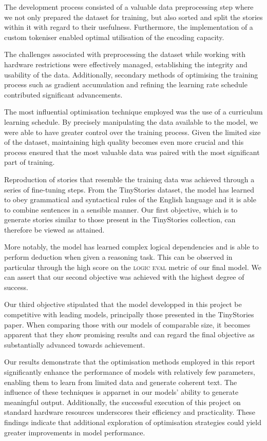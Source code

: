 \documentclass[11pt]{article}
\begin{document}
    The development process consisted of a valuable data preprocessing step where we not only prepared the dataset for training, but also sorted and split the stories within it with regard to their usefulness.
    Furthermore, the implementation of a custom tokeniser enabled optimal utilisation of the encoding capacity.

    The challenges associated with preprocessing the dataset while working with hardware restrictions were effectively managed, establishing the integrity and usability of the data.
    Additionally, secondary methods of optimising the training process such as gradient accumulation and refining the learning rate schedule contributed significant advancements.

    The most influential optimisation technique employed was the use of a curriculum learning schedule. By precisely manipulating the data available to the model, we were able to have greater control over the training process.
    Given the limited size of the dataset, maintaining high quality becomes even more crucial and this process ensured that the most valuable data was paired with the most significant part of training.

    Reproduction of stories that resemble the training data was achieved through a series of fine-tuning steps.
    From the TinyStories dataset, the model has learned to obey grammatical and syntactical rules of the English language and it is able to combine sentences in a sensible manner.
    Our first objective, which is to generate stories similar to those present in the TinyStories collection, can therefore be viewed as attained.

    More notably, the model has learned complex logical dependencies and is able to perform deduction when given a reasoning task.
    This can be observed in particular through the high score on the \textsc{logic eval} metric of our final model.
    We can assert that our second objective was achieved with the highest degree of success.

    Our third objective stipulated that the model developped in this project be competitive with leading models, principally those presented in the TinyStories paper. \cite{tinystories}
    When comparing those with our models of comparable size, it becomes apparent that they show promising results and can regard the final objective as substantially advanced towards achievement.

    Our results demonstrate that the optimisation methods employed in this report significantly enhance the performance of models with relatively few parameters, enabling them to learn from limited data and generate coherent text.
    The influence of these techniques is apparnet in our models' ability to generate meaningful output. Additionally, the successful execution of this project on standard hardware resources underscores their efficiency and practicality.
    These findings indicate that additional exploration of optimisation strategies could yield greater improvements in model performance.
\end{document}

